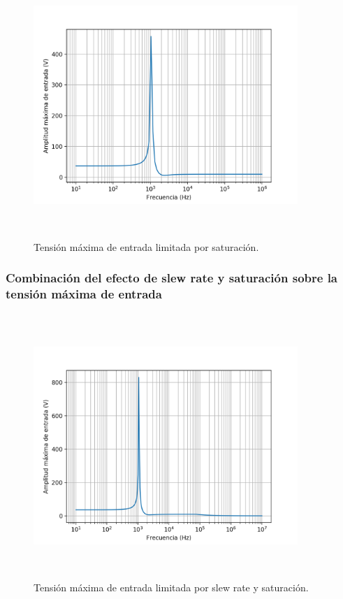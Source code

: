 

\begin{figure}[H] %
	\centering
	\includegraphics[width=10cm,height=10cm,keepaspectratio]{../EJ1/00GRAFICOS/vinmaxsat.png}
	\caption{Tensi\'on m\'axima de entrada limitada por saturaci\'on.}
	\label{vinmaxsat}
\end{figure}

\subsubsection*{Combinaci\'on del efecto de slew rate y saturaci\'on sobre la tensi\'on m\'axima de entrada}


\begin{figure}[H] %
	\centering
	\includegraphics[width=10cm,height=10cm,keepaspectratio]{../EJ1/00GRAFICOS/vinmaxtotal.png}
	\caption{Tensi\'on m\'axima de entrada limitada por slew rate y saturaci\'on.}
	\label{vinmaxtotal}
\end{figure}

